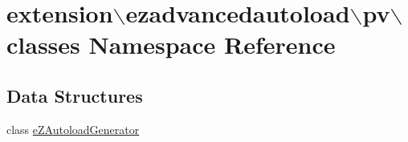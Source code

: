 \hypertarget{namespaceextension_1_1ezadvancedautoload_1_1pv_1_1classes}{\section{extension$\backslash$ezadvancedautoload$\backslash$pv$\backslash$classes Namespace Reference}
\label{namespaceextension_1_1ezadvancedautoload_1_1pv_1_1classes}
}
\subsection*{Data Structures}
\begin{DoxyCompactItemize}
\item 
class \hyperlink{classextension_1_1ezadvancedautoload_1_1pv_1_1classes_1_1e_z_autoload_generator}{e\-Z\-Autoload\-Generator}
\end{DoxyCompactItemize}
